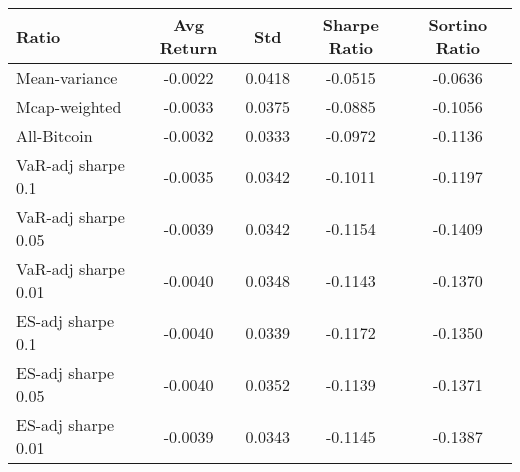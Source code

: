 \begin{tabular}{lcccc}
\toprule
Ratio & Avg Return & Std & Sharpe Ratio & Sortino Ratio\\
\midrule
Mean-variance & -0.0022 & 0.0418 & -0.0515 & -0.0636\\
Mcap-weighted & -0.0033 & 0.0375 & -0.0885 & -0.1056\\
All-Bitcoin & -0.0032 & 0.0333 & -0.0972 & -0.1136\\
VaR-adj sharpe 0.1 & -0.0035 & 0.0342 & -0.1011 & -0.1197\\
VaR-adj sharpe 0.05 & -0.0039 & 0.0342 & -0.1154 & -0.1409\\
VaR-adj sharpe 0.01 & -0.0040 & 0.0348 & -0.1143 & -0.1370\\
ES-adj sharpe 0.1 & -0.0040 & 0.0339 & -0.1172 & -0.1350\\
ES-adj sharpe 0.05 & -0.0040 & 0.0352 & -0.1139 & -0.1371\\
ES-adj sharpe 0.01 & -0.0039 & 0.0343 & -0.1145 & -0.1387\\
\bottomrule
\end{tabular}
